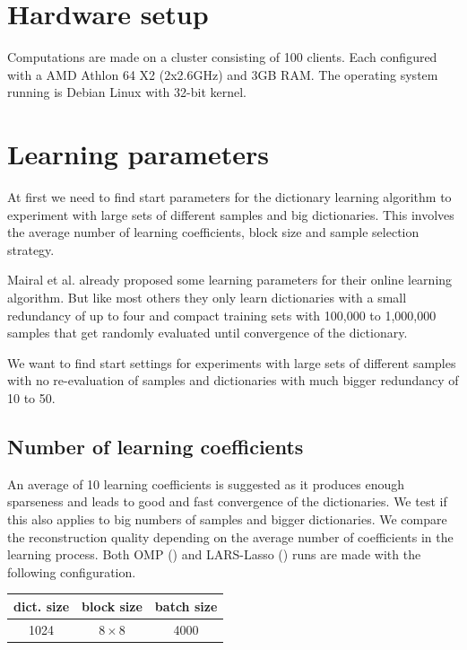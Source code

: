 \section{Hardware setup} 
Computations are made on a cluster consisting of 100 clients. Each 
configured with a AMD Athlon 64 X2 (2x2.6GHz) and 3GB RAM.
The operating system running is Debian Linux with 32-bit kernel. 

\section{Learning parameters}
At first we need to find start parameters for the dictionary learning
algorithm to experiment with large sets of different samples and big
dictionaries. This involves the average number of learning
coefficients, block size and sample selection strategy.

Mairal et al. already proposed some learning parameters for their online
learning algorithm. But like most others they only learn dictionaries with
a small redundancy of up to four and compact training sets with 100,000
to 1,000,000 samples that get randomly evaluated until convergence of the
dictionary.

We want to find start settings for experiments with large sets of
different samples with no re-evaluation of samples and dictionaries
with much bigger redundancy of 10 to 50.

\subsection{Number of learning coefficients}
An average of 10 learning coefficients is suggested as it produces enough
sparseness and leads to good and fast convergence of the dictionaries.
We test if this also applies to big numbers of samples and bigger
dictionaries. We compare the reconstruction quality depending on the average
number of coefficients in the learning process. 
Both OMP () and LARS-Lasso
() runs are made with the following
configuration.
\begin{table}[H]
\centering
\begin{tabular}{| c | c | c |}
\hline
\hline
dict. size & block size & batch size \\
\hline
1024 & $8\times 8$ & 4000  \\
\hline
\end{tabular}
\end{table}


